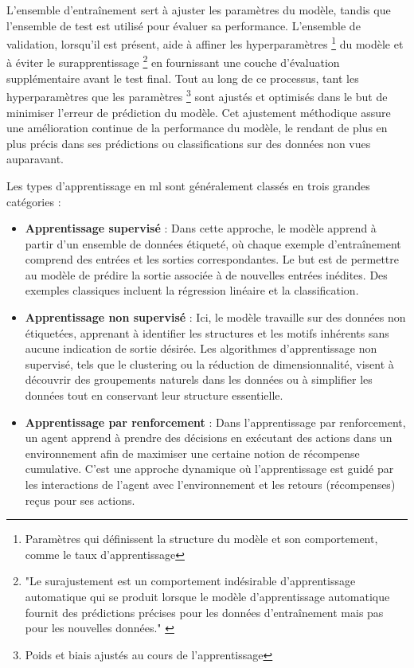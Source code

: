 L'ensemble d'entraînement sert à ajuster les paramètres du modèle, tandis que l'ensemble de test est utilisé pour évaluer sa performance. L'ensemble de validation, lorsqu'il est présent, aide à affiner les hyperparamètres \footnote{Paramètres qui définissent la structure du modèle et son comportement, comme le taux d'apprentissage} du modèle et à éviter le surapprentissage \footnote{"Le surajustement est un comportement indésirable d'apprentissage automatique qui se produit lorsque le modèle d'apprentissage automatique fournit des prédictions précises pour les données d'entraînement mais pas pour les nouvelles données." \cite{overfitting}} en fournissant une couche d'évaluation supplémentaire avant le test final. Tout au long de ce processus, tant les hyperparamètres que les paramètres \footnote{Poids et biais ajustés au cours de l'apprentissage} sont ajustés et optimisés dans le but de minimiser l'erreur de prédiction du modèle. Cet ajustement méthodique assure une amélioration continue de la performance du modèle, le rendant de plus en plus précis dans ses prédictions ou classifications sur des données non vues auparavant.


Les types d'apprentissage en \ac{ml} sont généralement classés en trois grandes catégories :

\begin{itemize}
    \item \textbf{Apprentissage supervisé} : Dans cette approche, le modèle apprend à partir d'un ensemble de données étiqueté, où chaque exemple d'entraînement comprend des entrées et les sorties correspondantes. Le but est de permettre au modèle de prédire la sortie associée à de nouvelles entrées inédites. Des exemples classiques incluent la régression linéaire et la classification.

    \item \textbf{Apprentissage non supervisé} : Ici, le modèle travaille sur des données non étiquetées, apprenant à identifier les structures et les motifs inhérents sans aucune indication de sortie désirée. Les algorithmes d'apprentissage non supervisé, tels que le clustering ou la réduction de dimensionnalité, visent à découvrir des groupements naturels dans les données ou à simplifier les données tout en conservant leur structure essentielle.

    \item \textbf{Apprentissage par renforcement} : Dans l'apprentissage par renforcement, un agent apprend à prendre des décisions en exécutant des actions dans un environnement afin de maximiser une certaine notion de récompense cumulative. C'est une approche dynamique où l'apprentissage est guidé par les interactions de l'agent avec l'environnement et les retours (récompenses) reçus pour ses actions.
\end{itemize}

